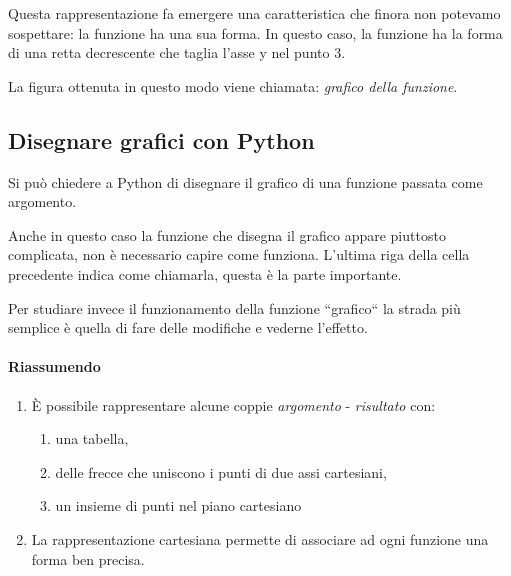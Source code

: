 \begin{minipage}{.49\textwidth}
Questa rappresentazione fa emergere una caratteristica che finora non 
potevamo sospettare: la funzione ha una sua forma. In questo caso, la 
funzione ha la forma di una retta decrescente che taglia l'asse y nel punto 
\(3\).

La figura ottenuta in questo modo viene chiamata: 
\emph{grafico della funzione}.
\end{minipage}
\begin{minipage}{.49\textwidth}
\begin{center} \scalebox{.6}{\graficob} \end{center}
\end{minipage}


\subsection{Disegnare grafici con Python}

Si può chiedere a Python di disegnare il grafico di una funzione passata 
come argomento.


\begin{minipage}{.39\textwidth}
\begin{center}
\end{center}
\end{minipage}
\begin{minipage}{.59\textwidth}
Anche in questo caso la funzione che disegna il grafico appare piuttosto 
complicata, non è necessario capire come funziona.
L'ultima riga della cella precedente indica come chiamarla, questa è la 
parte importante.

Per studiare invece il funzionamento della funzione ``grafico`` la strada 
più semplice è quella di fare delle modifiche e vederne l'effetto.
\end{minipage}

\paragraph{Riassumendo}

\begin{enumerate} [nosep]
\item È possibile rappresentare alcune coppie \emph{argomento} - 
\emph{risultato} con:
\begin{enumerate} [nosep]
  \item una tabella,
  \item delle frecce che uniscono i punti di due assi cartesiani,
  \item un insieme di punti nel piano cartesiano
\end{enumerate}
\item La rappresentazione cartesiana permette di associare ad ogni funzione 
una forma ben precisa.
\end{enumerate}

